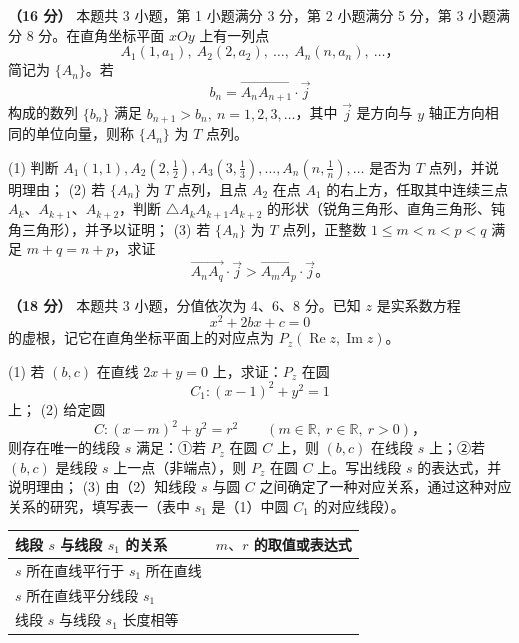 \begin{question}
\textbf{（16 分）} 本题共 3 小题，第 1 小题满分 3 分，第 2 小题满分 5 分，第 3 小题满分 8 分。在直角坐标平面 \(xOy\) 上有一列点
\nopagebreak[4]
\[
A_1(1,a_1),\ A_2(2,a_2),\ \ldots,\ A_n(n,a_n),\ \ldots\text{，}
\]
简记为 \(\{A_n\}\)。若
\nopagebreak[4]
\[
b_n=\overrightarrow{A_nA_{n+1}}\cdot\vec j
\]
构成的数列 \(\{b_n\}\) 满足 \(b_{n+1}>b_n,\ n=1,2,3,\ldots\)，其中 \(\vec j\) 是方向与 \(y\) 轴正方向相同的单位向量，则称 \(\{A_n\}\) 为 \(T\) 点列。

(1) 判断 \(A_1(1,1), A_2(2,\frac12), A_3(3,\frac13),\ldots,A_n(n,\frac1n),\ldots\) 是否为 \(T\) 点列，并说明理由；
(2) 若 \(\{A_n\}\) 为 \(T\) 点列，且点 \(A_2\) 在点 \(A_1\) 的右上方，任取其中连续三点 \(A_k\text{、}A_{k+1}\text{、}A_{k+2}\)，判断 \(\triangle A_kA_{k+1}A_{k+2}\) 的形状（锐角三角形、直角三角形、钝角三角形），并予以证明；
(3) 若 \(\{A_n\}\) 为 \(T\) 点列，正整数 \(1\le m<n<p<q\) 满足 \(m+q=n+p\)，求证
\nopagebreak[4]
   \[
   \overrightarrow{A_nA_q}\cdot\vec j>\overrightarrow{A_mA_p}\cdot\vec j\text{。}
   \]

\end{question}
\begin{question}
\textbf{（18 分）} 本题共 3 小题，分值依次为 4、6、8 分。已知 \(z\) 是实系数方程
\nopagebreak[4]
\[
x^2+2bx+c=0
\]
的虚根，记它在直角坐标平面上的对应点为 \(P_z(\operatorname{Re}z,\operatorname{Im}z)\)。

(1) 若 \((b,c)\) 在直线 \(2x+y=0\) 上，求证：\(P_z\) 在圆
\nopagebreak[4]
   \[
   C_1:(x-1)^2+y^2=1
   \]
   上；
(2) 给定圆
\nopagebreak[4]
   \[
   C:(x-m)^2+y^2=r^2\qquad(m\in\mathbb R,\ r\in\mathbb R,\ r>0)\text{，}
   \]
   则存在唯一的线段 \(s\) 满足：①若 \(P_z\) 在圆 \(C\) 上，则 \((b,c)\) 在线段 \(s\) 上；②若 \((b,c)\) 是线段 \(s\) 上一点（非端点），则 \(P_z\) 在圆 \(C\) 上。写出线段 \(s\) 的表达式，并说明理由；
(3) 由（2）知线段 \(s\) 与圆 \(C\) 之间确定了一种对应关系，通过这种对应关系的研究，填写表一（表中 \(s_1\) 是（1）中圆 \(C_1\) 的对应线段）。

\begin{center}
\begin{tabular}{ll}
\toprule
线段 \(s\) 与线段 \(s_1\) 的关系 & \(m\text{、}r\) 的取值或表达式 \\
\midrule
\(s\) 所在直线平行于 \(s_1\) 所在直线 &  \\
\(s\) 所在直线平分线段 \(s_1\) &  \\
线段 \(s\) 与线段 \(s_1\) 长度相等 &  \\
\bottomrule
\end{tabular}
\end{center}

\end{question}